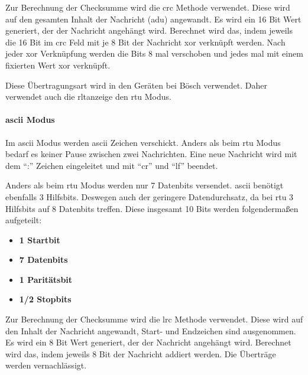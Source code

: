 Zur Berechnung der Checksumme wird die \acf{crc} Methode verwendet. Diese wird auf den gesamten Inhalt der Nachricht (\acs{adu}) angewandt. Es wird ein 16 Bit Wert generiert, der der Nachricht angehängt wird. Berechnet wird das, indem jeweils die 16 Bit im \acs{crc} Feld mit je 8 Bit der Nachricht \gls{xor} verknüpft werden. Nach jeder \gls{xor} Verknüpfung werden die Bits 8 mal verschoben und jedes mal mit einem fixierten Wert \gls{xor} verknüpft. 

Diese Übertragungsart wird in den Geräten bei Bösch verwendet. Daher verwendet auch die \acs{rltanzeige} den \acs{rtu} Modus.

\paragraph{\acs{ascii} Modus}
Im \acs{ascii} Modus werden \acs{ascii} Zeichen verschickt. Anders als beim \acs{rtu} Modus bedarf es keiner Pause zwischen zwei Nachrichten. Eine neue Nachricht wird mit dem \enquote{:} Zeichen eingeleitet und mit \enquote{\gls{cr}} und \enquote{\gls{lf}} beendet.

Anders als beim \acs{rtu} Modus werden nur 7 Datenbits versendet. \acs{ascii} benötigt ebenfalls 3 Hilfsbits. Deswegen auch der geringere Datendurchsatz, da bei \acs{rtu} 3 Hilfsbits auf 8 Datenbits treffen. Diese insgesamt 10 Bits werden folgendermaßen aufgeteilt:
\begin{itemize}
	\item \textbf{1 Startbit}
	\item \textbf{7 Datenbits}
	\item \textbf{1 Paritätsbit}
	\item \textbf{1/2 Stopbits}
\end{itemize}

Zur Berechnung der Checksumme wird die \acf{lrc} Methode verwendet. Diese wird auf den Inhalt der Nachricht angewandt, Start- und Endzeichen sind ausgenommen. Es wird ein 8 Bit Wert generiert, der der Nachricht angehängt wird. Berechnet wird das, indem jeweils 8 Bit der Nachricht addiert werden. Die Überträge werden vernachlässigt.

